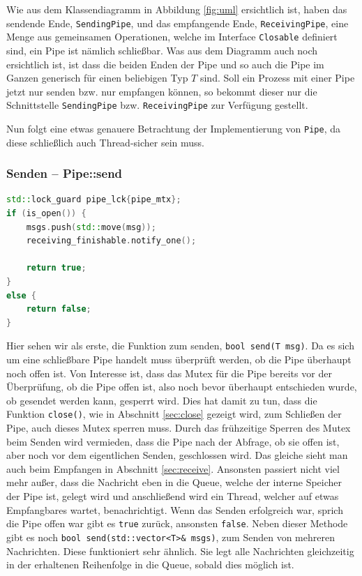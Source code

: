 Wie aus dem Klassendiagramm in Abbildung \ref{fig:uml} ersichtlich ist, haben das sendende Ende, \verb|SendingPipe|, und das empfangende Ende, 
\verb|ReceivingPipe|, eine Menge aus gemeinsamen Operationen, welche im Interface \verb|Closable| definiert sind, ein Pipe ist nämlich schließbar. 
Was aus dem Diagramm auch noch ersichtlich ist, ist dass die beiden Enden der Pipe und so auch die Pipe im Ganzen generisch für einen beliebigen Typ $T$ sind. 
Soll ein Prozess mit einer Pipe jetzt nur senden bzw. nur empfangen können, so bekommt dieser nur die Schnittstelle \verb|SendingPipe| bzw. 
\verb|ReceivingPipe| zur Verfügung gestellt.

Nun folgt eine etwas genauere Betrachtung der Implementierung von \verb|Pipe|, da diese schließlich auch Thread-sicher sein muss.

\subsubsection{Senden -- Pipe::send}
\label{sec:send}

\noindent\hrulefill\par
\begin{minipage}{\linewidth}
\begin{lstlisting}[language=C++, caption=Senden einer Nachricht ... bool send(T msg)]
std::lock_guard pipe_lck{pipe_mtx};
if (is_open()) {
    msgs.push(std::move(msg));
    receiving_finishable.notify_one();

    return true;
}
else {
    return false;
}  
\end{lstlisting}
\end{minipage}

Hier sehen wir als erste, die Funktion zum senden, \verb|bool send(T msg)|. Da es sich um eine schließbare Pipe handelt muss überprüft werden, 
ob die Pipe überhaupt noch offen ist. Von Interesse ist, dass das Mutex für die Pipe bereits vor der Überprüfung, ob die Pipe offen ist, also noch bevor 
überhaupt entschieden wurde, ob gesendet werden kann, gesperrt wird. Dies hat damit zu tun, dass die Funktion \verb|close()|, wie in Abschnitt \ref{sec:close}
gezeigt wird, zum Schließen der Pipe, auch dieses Mutex sperren muss. Durch das frühzeitige Sperren des Mutex beim Senden wird vermieden, dass die Pipe nach 
der Abfrage, ob sie offen ist, aber noch vor dem eigentlichen Senden, geschlossen wird. Das gleiche sieht man auch beim Empfangen in Abschnitt 
\ref{sec:receive}. Ansonsten passiert nicht viel mehr außer, dass die Nachricht eben in die Queue, welche der interne Speicher der Pipe ist, gelegt wird und 
anschließend wird ein Thread, welcher auf etwas Empfangbares wartet, benachrichtigt. Wenn das Senden erfolgreich war, sprich die Pipe offen war gibt es 
\verb|true| zurück, ansonsten \verb|false|. Neben dieser Methode gibt es noch \verb|bool send(std::vector<T>& msgs)|, zum Senden von mehreren Nachrichten. 
Diese funktioniert sehr ähnlich. Sie legt alle Nachrichten gleichzeitig in der erhaltenen Reihenfolge in die Queue, sobald dies möglich ist.

